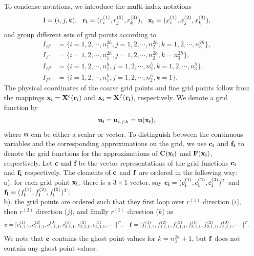  To condense notations, we introduce the multi-index notations
\[{\bf i} = (i,j,k),\ \ {\bf r}_{\bf i} = (r^{(1)}_i,r^{(2)}_j,r^{(3)}_k),\ \ {\bf x}_{\bf i} = (x^{(1)}_i,x^{(2)}_j,x^{(3)}_k),\]
and group different sets of grid points according to
\begin{equation*}
\begin{aligned}
	I_{\Omega^c} &= \{i = 1,2,\cdots,n_1^{2h}, j = 1,2,\cdots,n_2^{2h}, k = 1,2,\cdots,n_3^{2h}\},\\
	I_{\Gamma^c} & = \{i = 1,2,\cdots,n_1^{2h}, j = 1,2,\cdots,n_2^{2h}, k = n_3^{2h}\},\\
	I_{\Omega^f} &= \{i = 1,2,\cdots,n_1^h, j = 1,2,\cdots,n_2^h, k = 1,2,\cdots,n_3^h\},\\
	I_{\Gamma^f} & = \{i = 1,2,\cdots,n_1^{h}, j = 1,2,\cdots,n_2^{h}, k = 1\}.
\end{aligned}	
\end{equation*}
The physical coordinates of the coarse grid points and fine grid points follow from the mappings ${\bf x}_{\bf i} = {\bf X}^c({\bf r}_{\bf i})$ and ${\bf x}_{\bf i} = {\bf X}^f({\bf r}_{\bf i})$, respectively. We denote a grid function by
\[{\bf u}_{\bf i} = {\bf u}_{i,j,k} = {\bf u}({\bf x}_{\bf i}),\]
where ${\bf u}$ can be either a scalar or vector. To distinguish between the continuous variables and the corresponding approximations on the grid, we use ${\bf c}_{\bf i}$ and ${\bf f}_{\bf i}$ to denote the grid functions for the approximations of ${\bf C}({\bf x}_{\bf i})$ and ${\bf F}({\bf x}_{\bf i})$, respectively. Let {\bf c} and {\bf f} be the vector representations of the grid functions ${\bf c_i}$ and ${\bf f_i}$ respectively. The elements of $\bf c$ and $\bf f$ are ordered in the following way:\\
		a). for each grid point ${\bf x}_{\bf i}$, there is a $3\times 1$ vector, say ${\bf c}_{\bf i} = (c^{(1)}_{\bf i}, c^{(2)}_{\bf i}, c^{(3)}_{\bf i})^T$ and ${\bf f}_{\bf i} = (f^{(1)}_{\bf i}, f^{(2)}_{\bf i}, f^{(3)}_{\bf i})^T$;\\
		b). the grid points are ordered such that they first loop over $r^{(1)}$ direction ($i$), then $r^{(2)}$ direction ($j$), and finally $r^{(3)}$ direction ($k$) as  
		\[{\bf c} = [c^{(1)}_{1,1,1}, c^{(2)}_{1,1,1}, c^{(3)}_{1,1,1},c^{(1)}_{2,1,1}, c^{(2)}_{2,1,1}, c^{(3)}_{2,1,1},\cdots]^T, \quad {\bf f} = [f^{(1)}_{1,1,1}, f^{(2)}_{1,1,1}, f^{(3)}_{1,1,1},f^{(1)}_{2,1,1}, f^{(2)}_{2,1,1}, f^{(3)}_{2,1,1},\cdots]^T.\] 
		We note that $\bf c$ contains the ghost point values for $k = n_3^{2h}+1$, but ${\bf f}$ does not contain any ghost point values.
	
